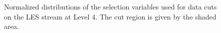 \documentclass{gatech-thesis}
\begin{document}
\begin{figure}
\caption[L4 LES Cut Distributions]{Normalized distributions of the selection variables used for data cuts on the LES stream at Level 4. The cut region is given by the shaded area.} 
\label{fig:LESL4ParameterPlots}
\end{figure}
\end{document}
